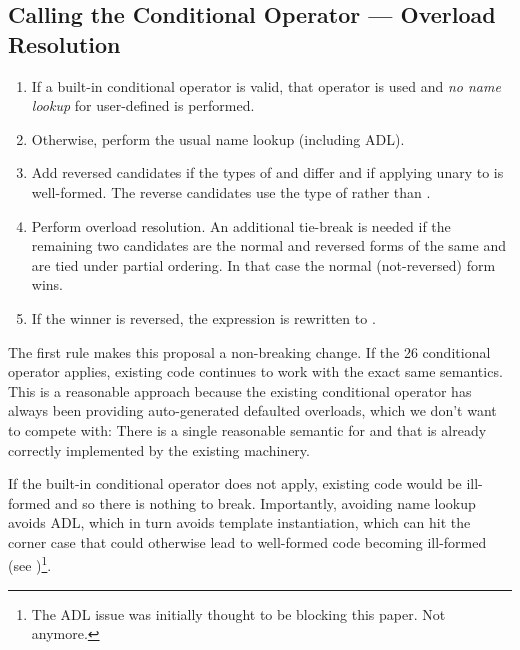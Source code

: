 \subsection{Calling the Conditional Operator --- Overload Resolution}
\begin{enumerate}
  \item If a built-in conditional operator is valid, that operator is used and
    \emph{no name lookup} for user-defined  is performed.

  \item Otherwise, perform the usual name lookup (including ADL).

  \item Add reversed candidates if the types of  and 
    differ and if applying unary \code{!} to  is well-formed.
    The reverse candidates use the type of  rather than .

  \item Perform overload resolution.
    An additional tie-break is needed if the remaining two candidates are the
    normal and reversed forms of the same  and are tied under
    partial ordering.
    In that case the normal (not-reversed) form wins.

  \item If the winner is reversed, the  expression is rewritten
    to .
\end{enumerate}

The first rule makes this proposal a non-breaking change.
If the \CC{}26 conditional operator applies, existing code continues to work
with the exact same semantics.
This is a reasonable approach because the existing conditional operator has
always been providing auto-generated defaulted  overloads,
which we don't want to compete with:
There is a single reasonable semantic for  and that is already
correctly implemented by the existing machinery.

If the built-in conditional operator does not apply, existing code would be
ill-formed and so there is nothing to break.
Importantly, avoiding name lookup avoids ADL, which in turn avoids template
instantiation, which can hit the corner case that could otherwise lead to
well-formed code becoming ill-formed (see \cite{P2600R0})\footnote{%
  The ADL issue was initially thought to be blocking this paper.
  Not anymore.}.

